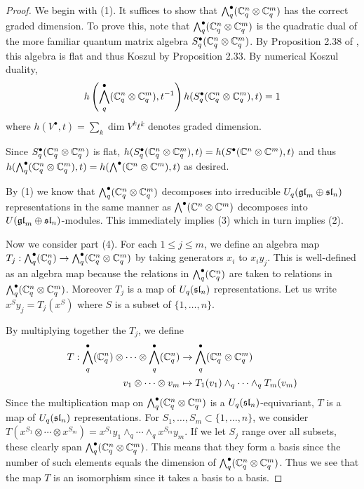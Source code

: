 \documentclass[11pt,leqno]{article}
\begin{document}
\begin{proof}
We begin with (1). It suffices to show that $ \Alt^\bullet_q(\bC_q^n \otimes \bC_q^m) $   has the correct graded dimension.  To prove this, note that $\Alt^\bullet_q(\bC_q^n \otimes \bC_q^m) $ is the quadratic dual of the more familiar quantum matrix algebra $ S_q^\bullet (\bC_q^n \otimes \bC_q^m) $.  By Proposition 2.38 of \cite{BZ}, this algebra is flat and thus Koszul by Proposition 2.33.  By numerical Koszul duality,
$$ h\left(\Alt^\bullet_q( \bC_q^n \otimes \bC_q^m), t^{-1}\right) h(S^\bullet_q (\bC_q^n \otimes \bC_q^m), t) = 1 $$ 
where $ h(V^\bullet, t) = \sum_k \dim V^k t^k $ denotes graded dimension.
    
Since $ S^\bullet_q (\bC_q^n \otimes \bC_q^m) $ is flat, $ h(S^\bullet_q (\bC_q^n \otimes \bC_q^m), t) =  h(S^\bullet (\bC^n \otimes \bC^m), t) $ and thus  $ h(\Alt^\bullet_q (\bC_q^n \otimes \bC_q^m), t) =  h(\Alt^\bullet (\bC^n \otimes \bC^m), t)$ as desired.
    
By (1) we know that $ \Alt^\bullet_q(\bC_q^n \otimes \bC_q^m) $ decomposes into irreducible $ U_q(\gl_m \oplus \sl_n) $ representations in the same manner as $ \Alt^\bullet(\bC^n \otimes \bC^m) $ decomposes into $ U(\gl_m \oplus \sl_n)$-modules. This immediately implies (3) which in turn implies (2).

Now we consider part (4).  For each $ 1 \le j \le m$, we define an algebra map $T_j : \Alt^\bullet_q(\bC_q^n) \rightarrow \Alt^\bullet_q (\bC_q^n \otimes \bC_q^m) $ by taking generators $ x_i $ to $ x_i y_j$.  This is well-defined as an algebra map because the relations in $ \Alt^\bullet_q(\bC_q^n) $ are taken to relations in $\Alt^\bullet_q (\bC_q^n \otimes \bC_q^m)$.  Moreover $T_j $ is a map of $ U_q(\sl_n) $ representations.   Let us write $ x^S y_j = T_j(x^S) $ where $ S $ is a subset of $ \{ 1, \dots, n \} $.

By multiplying together the $ T_j $, we define
\begin{align*}
T : \Alt^\bullet_q(\bC_q^n) \otimes \cdots \otimes \Alt^\bullet_q(\bC_q^n) &\rightarrow \Alt_q^\bullet (\bC_q^n \otimes \bC_q^m) \\
v_1 \otimes \cdots \otimes v_m &\mapsto T_1(v_1) \wedge_q \cdots \wedge_q T_m(v_m)
\end{align*}
Since the multiplication map on $\Alt_q^\bullet (\bC_q^n \otimes \bC_q^m)  $ is a $U_q(\sl_n)$-equivariant, $ T $ is a map of $ U_q(\sl_n) $ representations. For $ S_1, \dots, S_m \subset \{1, \dots, n \} $, we consider $ T(x^{S_1} \otimes \cdots \otimes x^{S_m}) = x^{S_1} y_1 \wedge_q \cdots \wedge_q x^{S_m}y_m $.  If we let $ S_j $ range over all subsets, these clearly span $ \Alt_q^\bullet (\bC_q^n \otimes \bC_q^m) $.  This means that they form a basis since the number of such elements equals the dimension of $ \Alt_q^\bullet (\bC_q^n \otimes \bC_q^m) $.  Thus we see that the map $ T $ is an isomorphism since it takes a basis to a basis. 
\end{proof}
\end{document}
